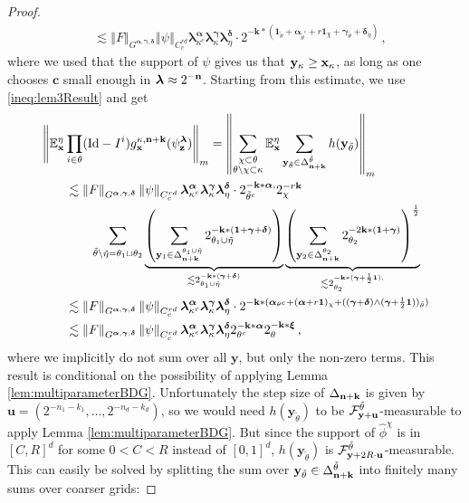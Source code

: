 \documentclass[12pt]{article}
\numberwithin{equation}{section}
\theoremstyle{plain}
\theoremstyle{definition}
\newcommand{\norm}[1]{\left\Vert #1\right\Vert}
\newcommand{\Id}{\mbox{Id}}
\def\bE{\mathbb{E}}\def\bW{\mathbb{W}}
\def\fc{\mathbf c}\def\fd{\mathbf d}
\def\fk{\mathbf k}\def\fl{\mathbf l}
\def\fu{\mathbf u}\def\fv{\mathbf v}
\def\fy{\mathbf y}\def\fz{\mathbf z}
\def\falpha{{\boldsymbol\alpha}}
\def\fgamma{{\boldsymbol\gamma}}
\def\fdelta{{\boldsymbol\delta}}
\def\flambda{{\boldsymbol\lambda}}
\def\fxi{{\boldsymbol\xi}}
\def\fone{{\boldsymbol 1}}
\begin{document}
\begin{proof}
\begin{align*}
        &\lesssim \norm{F}_{G^{\falpha,\fgamma,\fdelta}}\norm{\psi}_{C_c^{rd}}\flambda^{\falpha}_{{\kappa^c}}\flambda^{\fgamma}_{\kappa}\flambda^{\fdelta}_{\eta}\cdot 2^{-\fk*(\fone_{\tilde\theta}+\falpha_{\tilde\theta^c}+r\fone_\chi+\fgamma_{\tilde\theta}+\fdelta_{\tilde\eta})}\,,
        \end{align*}
    where we used that the support of $\psi$ gives us that $\fy_\kappa\ge\fx_\kappa$, as long as one chooses $\fc$  small enough in $\flambda\approx 2^{-\fn}$. Starting from this estimate, we use \eqref{ineq:lem3Result} and get
    \begin{align*}
        &\norm{\bE^\eta_\fx\prod_{i\in\theta}(\Id-I^i)g_\fx^{\kappa,\fn+\fk}(\psi_\fz^{\flambda})}_m = \norm{\sum_{\substack{\chi\subset\theta \\ \theta\setminus\chi\subset\kappa}} \bE^\eta_\fx\sum_{\fy_{\tilde\theta} \in\Delta_{\fn+\fk}^{\tilde\theta}} h(\fy_{\tilde\theta})}_m\\
        &\qquad\lesssim \norm{F}_{G^{\falpha,\fgamma,\fdelta}}\norm{\psi}_{C_c^{rd}}\flambda^{\falpha}_{{\kappa^c}}\flambda^{\fgamma}_{\kappa}\flambda^{\fdelta}_{\eta}\cdot 2^{-\fk*\falpha,}_{\tilde\theta^c}2^{-r\fk}_\chi\\&\qquad\qquad\sum_{\tilde\theta\setminus\tilde\eta = \theta_1\sqcup\theta_2}\underbrace{\left(\sum_{\fy_1\in\Delta_{\fn+\fk}^{\theta_1\cup\tilde \eta}}2^{-\fk*(\fone+\fgamma+\fdelta)}_{{\theta_1\cup\tilde\eta}}\right)}_{\lesssim 2^{-\fk*(\fgamma+\fdelta)}_{{\theta_1\cup\tilde\eta}}}\underbrace{\left(\sum_{\fy_2\in\Delta_{\fn+\fk}^{\theta_2}}2^{-2\fk*(\fone+\fgamma)}_{{\theta_2}}\right)^\frac 12}_{\lesssim 2^{-\fk*(\fgamma+\frac 12\fone),}_{{\theta_2}}}\\
        &\qquad \lesssim \norm{F}_{G^{\falpha,\fgamma,\fdelta}}\norm{\psi}_{C_c^{rd}}\flambda^{\falpha}_{{\kappa^c}}\flambda^{\fgamma}_{\kappa}\flambda^{\fdelta}_{\eta}\cdot 2^{-\fk*(\falpha_{\theta^c}+(\falpha+r\fone)_\chi+((\fgamma+\fdelta)\wedge(\fgamma+\frac 12\fone))_{\tilde\theta})}\\
        &\qquad\lesssim \norm{F}_{G^{\falpha,\fgamma,\fdelta}}\norm{\psi}_{C_c^{rd}}\flambda^{\falpha}_{\kappa^c}\flambda^{\fgamma}_{\kappa}\flambda^{\fdelta}_{\eta} 2^{-\fk*\falpha}_{{\theta^c}}2^{-\fk*\fxi}_{\theta}\,,
    \end{align*}
    where we implicitly do not sum over all $\fy$, but only the non-zero terms. This result is conditional on the possibility of applying Lemma \ref{lem:multiparameterBDG}. Unfortunately the step size of $\Delta_{\fn+\fk}$ is given by $\fu=(2^{-n_1-k_1},\dots,2^{-n_d-k_d})$, so we would need $h(\fy_{\tilde\theta})$ to be $\cF^{\tilde\theta}_{\fy+\fu}$-measurable to apply Lemma \ref{lem:multiparameterBDG}. But since the support of $\hat\phi^\chi$ is in $[C,R]^d$ for some $0<C<R$ instead of $[0,1]^d$, $h(\fy_{\tilde\theta})$ is $\cF^{\tilde\theta}_{\fy+2R\cdot\fu}$-measurable. This can easily be solved by splitting the sum over $\fy_{\tilde\theta}\in\Delta^{\tilde\theta}_{\fn+\fk}$ into finitely many sums over coarser grids:

\end{proof}
\end{document}
